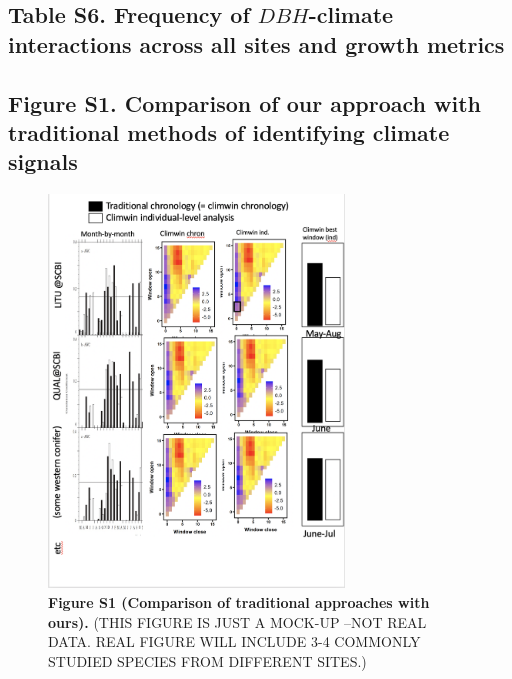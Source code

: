 \documentclass[
]{article}
\begin{document}
\newpage

\hypertarget{table-s6.-frequency-of-dbh-climate-interactions-across-all-sites-and-growth-metrics}{%
\subsection{\texorpdfstring{Table S6. Frequency of \(DBH\)-climate
interactions across all sites and growth
metrics}{Table S6. Frequency of DBH-climate interactions across all sites and growth metrics}}\label{table-s6.-frequency-of-dbh-climate-interactions-across-all-sites-and-growth-metrics}}

\newpage

\hypertarget{figure-s1.-comparison-of-our-approach-with-traditional-methods-of-identifying-climate-signals}{%
\subsection{Figure S1. Comparison of our approach with traditional
methods of identifying climate
signals}\label{figure-s1.-comparison-of-our-approach-with-traditional-methods-of-identifying-climate-signals}}

\begin{figure}
\centering
\includegraphics[width=0.7\textwidth,height=\textheight]{tables_figures/mock_comparison_traditional_method.png}
\caption{\textbf{Figure S1 \textbar{} (Comparison of traditional
approaches with ours).} (THIS FIGURE IS JUST A MOCK-UP --NOT REAL DATA.
REAL FIGURE WILL INCLUDE 3-4 COMMONLY STUDIED SPECIES FROM DIFFERENT
SITES.)}
\end{figure}
\end{document}
